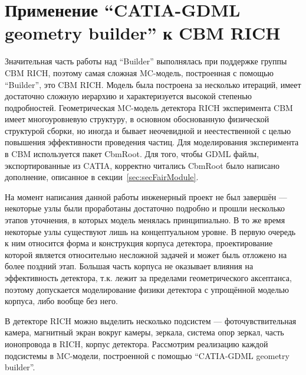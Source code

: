 \chapter{Применение ``CATIA-GDML geometry builder'' к CBM RICH}\label{sec:chapRICHgeom}

Значительная часть работы над ``Builder'' выполнялась при поддержке группы CBM RICH, поэтому самая сложная MC-модель, построенная с помощью ``Builder'', это CBM RICH. Модель была построена за несколько итераций, имеет достаточно сложную иерархию и характеризуется высокой степенью подробностей.
Геометрическая MC-модель детектора RICH эксперимента CBM имеет многоуровневую структуру, в основном обоснованную физической структурой сборки, но иногда и \todo бывает неочевидной и неестественной с целью повышения эффективности проведения частиц.
Для моделирования эксперимента в CBM используется пакет CbmRoot. Для того, чтобы GDML файлы, экспортированные из CATIA, корректно читались CbmRoot было написано дополнение, описанное в секции~\ref{sec:secFairModule}.

На момент написания данной работы инженерный проект не был завершён --- некоторые узлы были проработаны достаточно подробно и прошли несколько этапов уточнения, в которых модель менялась принципиально. В то же время некоторые узлы существуют лишь на концептуальном уровне. В первую очередь к ним относится форма и конструкция корпуса детектора, проектирование которой является относительно несложной задачей и может быль отложено на более поздний этап. Большая часть корпуса не оказывает влияния на эффективность детектора, т.к. лежит за пределами геометрического аксептанса, поэтому допускается моделирование физики детектора с упрощённой моделью корпуса, либо вообще без него.

В детекторе RICH можно выделить несколько подсистем --- фоточувствительная камера, магнитный экран вокруг камеры, зеркала, система опор зеркал, часть ионопровода в RICH, корпус детектора. Рассмотрим реализацию каждой подсистемы в MC-модели, построенной с помощью ``CATIA-GDML geometry builder''.

%                                   

